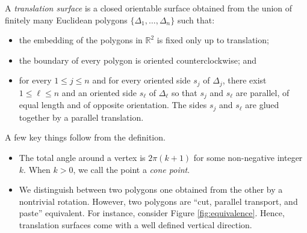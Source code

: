 \documentclass[12pt]{amsart}
\numberwithin{equation}{section}
\numberwithin{theorem}{section}
\newcommand{\RR}{\mathbb{R}}
\begin{document}
A \emph{translation surface} is a closed orientable surface obtained from the union of finitely many Euclidean polygons $\{\Delta_1, \dots, \Delta_n\}$ such that:
\begin{itemize}
\item the embedding of the polygons in $\RR^2$ is fixed only up to translation;
\item the boundary of every polygon is oriented counterclockwise; and
\item for every $1 \leq j \leq n$ and for every oriented side $s_j$ of $\Delta_j$, there exist $1 \leq \ell \leq n$ and an oriented side $s_\ell$ of $\Delta_\ell$ so that $s_j$ and $s_\ell$ are parallel, of equal length and of opposite orientation. The sides $s_j$ and $s_\ell$ are glued together by a parallel translation. 
\end{itemize}

A few key things follow from the definition.
\begin{itemize}
\item The total angle around a vertex is $2 \pi (k+1)$ for some non-negative integer $k$. When $k > 0$, we call the point a \emph{cone point}. 
\item We distinguish between two polygons one obtained from the other by a nontrivial rotation. However, two polygons are ``cut, parallel transport, and paste'' equivalent. For instance, consider Figure \ref{fig:equivalence}. Hence, translation surfaces come with a well defined vertical direction.
\end{itemize}
\end{document}
